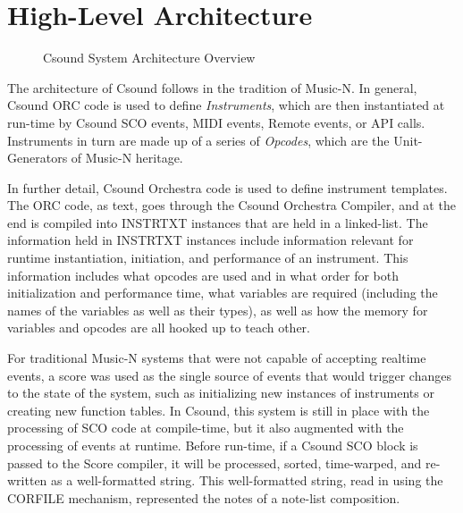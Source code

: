 \documentclass[]{book}
\begin{document}
\chapter{High-Level Architecture}

\begin{figure}[htbp]
\centerline{}
\caption{Csound System Architecture Overview}
\label{overview}
\end{figure}

The architecture of Csound follows in the tradition of Music-N. In general, Csound ORC code is used to define \emph{Instruments}, which are then instantiated at run-time by Csound SCO events, MIDI events, Remote events, or API calls. Instruments in turn are made up of a series of \emph{Opcodes}, which are the Unit-Generators of Music-N heritage.

In further detail, Csound Orchestra code is used to define instrument templates.  The ORC code, as text, goes through the Csound Orchestra Compiler, and at the end is compiled into INSTRTXT instances that are held in a linked-list.  The information held in INSTRTXT instances include information relevant for runtime instantiation, initiation, and performance of an instrument.  This information includes what opcodes are used and in what order for both initialization and performance time, what variables are required (including the names of the variables as well as their types), as well as how the memory for variables and opcodes are all hooked up to teach other.  

For traditional Music-N systems that were not capable of accepting realtime events, a score was used as the single source of events that would trigger changes to the state of the system, such as initializing new instances of instruments or creating new function tables. In Csound, this system is still in place with the processing of SCO code at compile-time, but it also augmented with the processing of events at runtime. Before run-time, if a Csound SCO block is passed to the Score compiler, it will be processed, sorted, time-warped, and re-written as a well-formatted string.  This well-formatted string, read in using the CORFILE mechanism, represented the notes of a note-list composition.  
\end{document}
